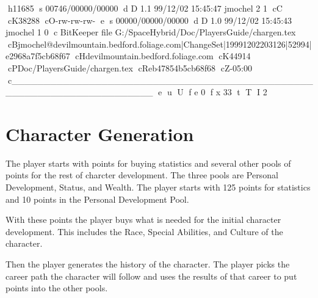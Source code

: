 h11685
s 00746/00000/00000
d D 1.1 99/12/02 15:45:47 jmochel 2 1
cC
cK38288
cO-rw-rw-rw-
e
s 00000/00000/00000
d D 1.0 99/12/02 15:45:43 jmochel 1 0
c BitKeeper file G:/SpaceHybrid/Doc/PlayersGuide/chargen.tex
cBjmochel@devilmountain.bedford.foliage.com|ChangeSet|19991202203126|52994|e2968a7f5cb68f67
cHdevilmountain.bedford.foliage.com
cK44914
cPDoc/PlayersGuide/chargen.tex
cReb47854b5cb68f68
cZ-05:00
c______________________________________________________________________
e
u
U
f e 0
f x 33
t
T
I 2

\chapter{Character Generation}

The player starts with points for buying statistics and several other pools 
of points for the rest of charcter development. The three 
pools are Personal Development, Status, and Wealth. The player starts 
with 125 points for statistics and 10 points in the Personal 
Development Pool. 

With these points the player buys what is needed for the initial 
character development. This includes the Race, Special Abilities, and 
Culture of the character. 

Then the player generates the history of the character. The player 
picks the career path the character will follow and uses the results 
of that career to put points into the other pools. 

